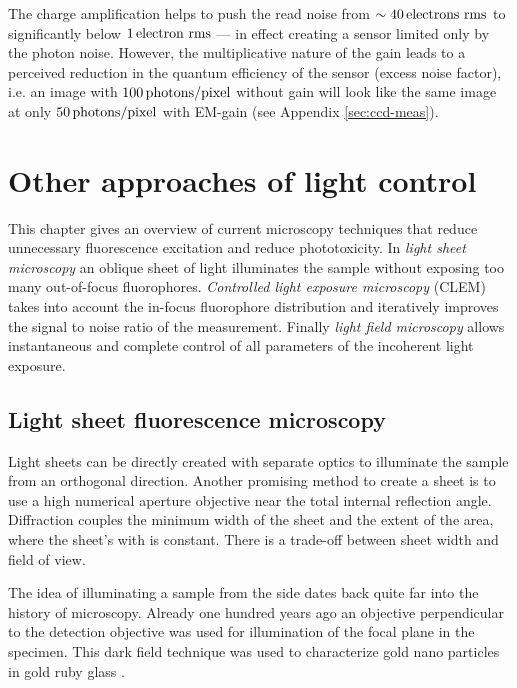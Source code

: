 The charge amplification helps to push the read noise from
$\sim\unit[40]{electrons\ rms}$ to significantly below
$\unit[1]{electron\ rms}$ --- in effect creating a sensor limited only
by the photon noise. However, the multiplicative nature of the gain
leads to a perceived reduction in the quantum efficiency of the sensor
(excess noise factor), i.e. an image with $\unit[100]{photons/pixel}$
without gain will look like the same image at only
$\unit[50]{photons/pixel}$ with EM-gain (see Appendix
\ref{sec:ccd-meas}).


\chapter{Other approaches of light control}
%
\begin{summary}
  This chapter gives an overview of current microscopy techniques that
  reduce unnecessary fluorescence excitation and reduce
  phototoxicity. In \emph{light sheet microscopy} an oblique sheet of
  light illuminates the sample without exposing too many out-of-focus
  fluorophores. \emph{Controlled light exposure microscopy}
  (CLEM) takes
  into account the in-focus fluorophore distribution and iteratively
  improves the signal to noise ratio of the measurement.  Finally
  \emph{light field microscopy} allows instantaneous and complete
  control of all parameters of the incoherent light exposure.
\end{summary}
\section{Light sheet fluorescence microscopy}
\begin{summary}
  Light sheets can be directly created with separate optics to
  illuminate the sample from an orthogonal direction. Another
  promising method to create a sheet is to use a high numerical
  aperture objective near the total internal reflection
  angle. Diffraction couples the minimum width of the sheet and the
  extent of the area, where the sheet's with is constant. There is a
  trade-off between sheet width and field of view.
\end{summary}
The idea of illuminating a sample from the side dates back quite
far into the history of microscopy. Already one hundred years ago an
objective perpendicular to the detection objective was used for
illumination of the focal plane in the specimen. This dark field
technique was used to characterize gold nano particles in gold ruby
glass \citep{Siedentopf1903}.

